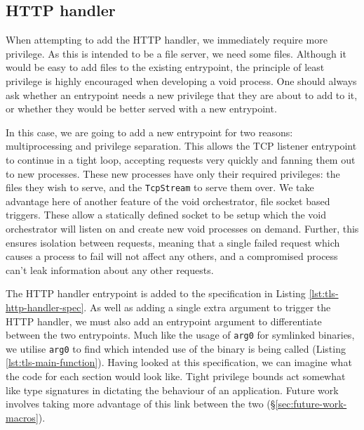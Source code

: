 \documentclass[12pt,a4paper,twoside]{report}
\begin{document}
\subsection{HTTP handler}
\label{sec:building-tls-http-handler}

When attempting to add the HTTP handler, we immediately require more privilege. As this is intended to be a file server, we need some files. Although it would be easy to add files to the existing entrypoint, the principle of least privilege is highly encouraged when developing a void process. One should always ask whether an entrypoint needs a new privilege that they are about to add to it, or whether they would be better served with a new entrypoint.

In this case, we are going to add a new entrypoint for two reasons: multiprocessing and privilege separation. This allows the TCP listener entrypoint to continue in a tight loop, accepting requests very quickly and fanning them out to new processes. These new processes have only their required privileges: the files they wish to serve, and the \texttt{TcpStream} to serve them over. We take advantage here of another feature of the void orchestrator, file socket based triggers. These allow a statically defined socket to be setup which the void orchestrator will listen on and create new void processes on demand. Further, this ensures isolation between requests, meaning that a single failed request which causes a process to fail will not affect any others, and a compromised process can't leak information about any other requests.

The HTTP handler entrypoint is added to the specification in Listing \ref{lst:tls-http-handler-spec}. As well as adding a single extra argument to trigger the HTTP handler, we must also add an entrypoint argument to differentiate between the two entrypoints. Much like the usage of \texttt{arg0} for symlinked binaries, we utilise \texttt{arg0} to find which intended use of the binary is being called (Listing \ref{lst:tls-main-function}). Having looked at this specification, we can imagine what the code for each section would look like. Tight privilege bounds act somewhat like type signatures in dictating the behaviour of an application. Future work involves taking more advantage of this link between the two (§\ref{sec:future-work-macros}).
\end{document}

